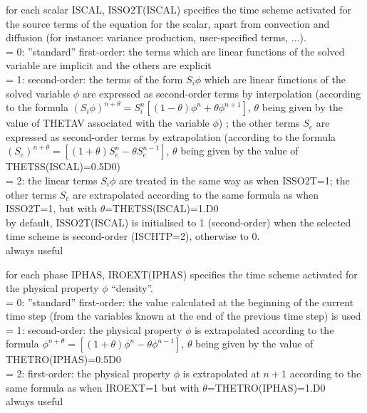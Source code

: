 {for each scalar ISCAL, ISSO2T(ISCAL) specifies the time scheme activated
for the source terms of the equation for the scalar, apart from convection and
diffusion (for instance: variance production, user-specified terms, ...).\\
\hspace*{1.3cm}= 0: ''standard'' first-order: the terms which are linear
functions of the solved variable are implicit and the others are explicit\\
\hspace*{1.3cm}= 1: second-order: the terms of the form $S_i\phi$ which are
linear functions of the solved variable
$\phi$ are expressed as second-order terms by interpolation (according
to the formula
$(S_i\phi)^{n+\theta}=S_i^n[(1-\theta)\phi^n+\theta\phi^{n+1}]$, $\theta$
being given by the value of THETAV associated with the variable $\phi$)
; the other terms $S_e$ are expressed as second-order terms by
extrapolation (according to the formula
$(S_e)^{n+\theta}=[(1+\theta)S_e^n-\theta S_e^{n-1}]$, $\theta$ being
given by the value of THETSS(ISCAL)=0.5D0)\\
\hspace*{1.3cm}= 2: the linear terms $S_i\phi$ are treated in the same
way as when ISSO2T=1;
the other terms $S_e$ are extrapolated according to the same formula
as when ISSO2T=1, but with $\theta$=THETSS(ISCAL)=1.D0\\
by default, ISSO2T(ISCAL) is initialised to 1 (second-order) when the selected
time scheme is second-order (ISCHTP=2), otherwise to 0.\\
always useful}


{for each phase IPHAS, IROEXT(IPHAS) specifies the time scheme activated
for the physical property $\phi$ ``density''.\\
\hspace*{1.3cm}= 0: ''standard'' first-order: the value calculated at
the beginning of the current time step (from the
variables known at the end of the previous time step) is used \\
\hspace*{1.3cm}= 1: second-order: the physical property $\phi$ is
extrapolated according to the formula
$\phi^{n+\theta}=[(1+\theta)\phi^n-\theta \phi^{n-1}]$, $\theta$ being
given by the value of THETRO(IPHAS)=0.5D0 \\
\hspace*{1.3cm}= 2: first-order: the physical property $\phi$ is
extrapolated at $n+1$ according to the
same formula as when IROEXT=1 but with $\theta$=THETRO(IPHAS)=1.D0\\
always useful}

